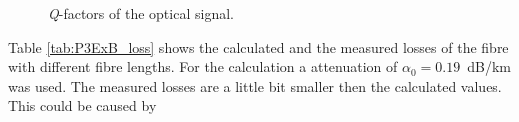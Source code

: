 \begin{figure}%
\centering
\caption{\textit{Q}-factors of the optical signal.}
\label{fig:P3_Q}%
\end{figure}

Table \ref{tab:P3ExB_loss} shows the calculated and the measured losses of the fibre with different fibre lengths. For the calculation a attenuation of $\alpha_0=0.19$~dB/km was used. The measured losses are a little bit smaller then the calculated values. This could be caused by 

